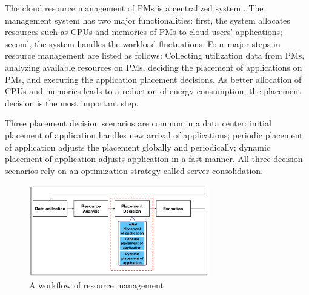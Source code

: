  The cloud resource management of PMs is a centralized system \cite{Jennings:2015ht}. The management system has two major functionalities: first, the system allocates resources such as CPUs and memories of PMs to cloud users' applications; second, the system handles the workload fluctuations. Four major steps in resource management are listed as follows: Collecting utilization data from PMs, analyzing available resources on PMs, deciding the placement of applications on PMs, and executing the application placement decisions.  As better allocation of CPUs and memories leads to a reduction of energy consumption, the placement decision is the most important step.

 Three placement decision scenarios are common in a data center: initial placement of application handles new arrival of applications; periodic placement of application adjusts the placement globally and periodically; dynamic placement of application adjusts application in a fast manner. All three decision scenarios rely on an optimization strategy called server consolidation. 
\begin{figure}
	\centering
	\includegraphics[width=0.7\textwidth]{pics/workflow_management.png}
	\caption{A workflow of resource management \cite{Mishra:2012kx}}
	\label{fig:workflow}
\end{figure}




